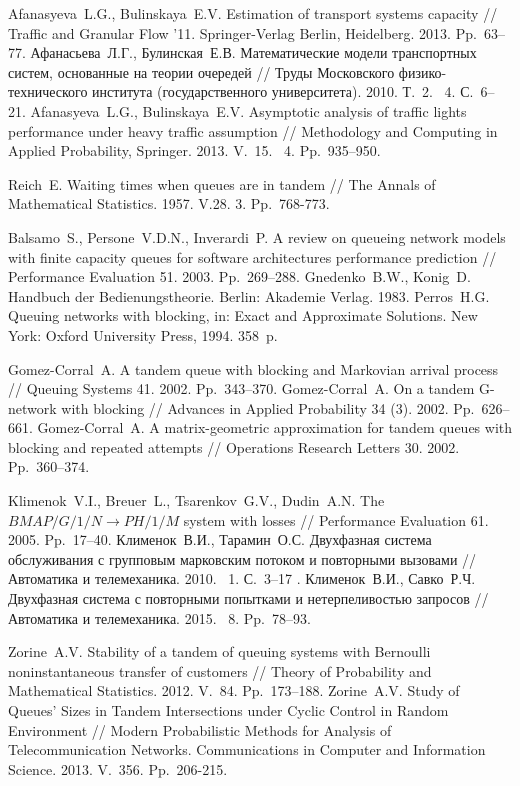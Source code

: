 \documentclass[a4paper,twoside]{article}
\theoremstyle{theorem}
\theoremstyle{remark}
\newcommand{\No}{\textnumero}
\begin{document}
\begin{thebibliography}{99}
 Afanasyeva~L.G., Bulinskaya~E.V. Estimation of transport systems capacity // Traffic and Granular Flow '11. Springer-Verlag Berlin, Heidelberg. 2013. Pp.~63--77.
 Афанасьева~Л.Г., Булинская~Е.В. Математические модели транспортных систем, основанные на теории очередей // Труды Московского физико-технического института (государственного университета). 2010. Т.~2. \No{}~4. С.~6–21.
 Afanasyeva~L.G., Bulinskaya~E.V. Asymptotic analysis of traffic lights performance under heavy traffic assumption // Methodology and Computing in Applied Probability, Springer. 2013. V.~15. \No{}~4. Pp.~935--950.

 Reich~E.  Waiting times when queues are in tandem // The Annals of Mathematical Statistics. 1957. V.28. \No{}3. Pp.~768-773.

 Balsamo~S., Persone~V.D.N., Inverardi~P. A review on queueing network models with finite capacity queues for software architectures performance prediction // Performance Evaluation 51. 2003. Pp.~269–288.
 Gnedenko~B.W., Konig~D. Handbuch der Bedienungstheorie. Berlin: Akademie Verlag. 1983. 
 Perros~H.G.  Queuing networks with blocking, in: Exact and Approximate Solutions. New York: Oxford University Press, 1994. 358~p.


 Gomez-Corral~A. A tandem queue with blocking and Markovian arrival process // Queuing Systems 41. 2002. Pp.~343--370.
 Gomez-Corral~A. On a tandem G-network with blocking // Advances in Applied Probability 34 (3). 2002. Pp.~626--661.
 Gomez-Corral~A. A matrix-geometric approximation for tandem queues with blocking and repeated attempts // Operations Research Letters  30. 2002. Pp.~360--374.

 Klimenok~V.I., Breuer~L., Tsarenkov~G.V., Dudin~A.N. The $BMAP/G/1/N \to PH/1/M$ system with losses // Performance Evaluation 61. 2005. Pp.~17--40.
 Клименок~В.И., Тарамин~О.С. Двухфазная система обслуживания с групповым марковским потоком и повторными вызовами // Автоматика и телемеханика. 2010. \No~1. С.~3--17 .
 Клименок~В.И., Савко~Р.Ч. Двухфазная система с повторными попытками и нетерпеливостью запросов // Автоматика и телемеханика. 2015. \No{}~8. Pp.~78--93. 

 Zorine~A.V. Stability of a tandem of queuing systems with Bernoulli noninstantaneous transfer of customers // Theory of Probability and Mathematical Statistics. 2012. V.~84. Pp.~173--188.
 Zorine~A.V. Study of Queues' Sizes in Tandem Intersections under Cyclic Control in Random Environment // Modern Probabilistic Methods for Analysis of Telecommunication Networks. Communications in Computer and Information Science. 2013. V.~356. Pp.~206-215.


\end{thebibliography}
\end{document}
